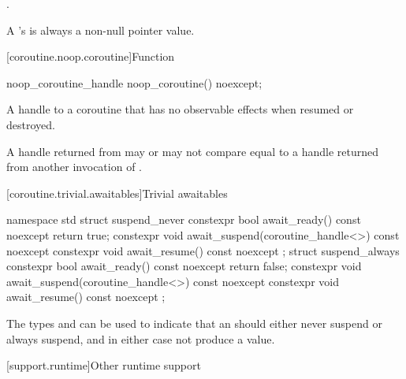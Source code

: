 \begin{itemdescr}
\pnum
\returns
{}.

\pnum
\remarks
A 's  is always a
non-null pointer value.
\end{itemdescr}

[coroutine.noop.coroutine]{Function }

%
\begin{itemdecl}
noop_coroutine_handle noop_coroutine() noexcept;
\end{itemdecl}

\begin{itemdescr}
\pnum
\returns
A handle to a coroutine that has no observable effects
when resumed or destroyed.

\pnum
\remarks
A handle returned from  may or may not
compare equal to a handle returned from another invocation
of .
\end{itemdescr}

[coroutine.trivial.awaitables]{Trivial awaitables}

%
%
%
%
%
%
%
%
\begin{codeblock}
namespace std {
  struct suspend_never {
    constexpr bool await_ready() const noexcept { return true; }
    constexpr void await_suspend(coroutine_handle<>) const noexcept {}
    constexpr void await_resume() const noexcept {}
  };
  struct suspend_always {
    constexpr bool await_ready() const noexcept { return false; }
    constexpr void await_suspend(coroutine_handle<>) const noexcept {}
    constexpr void await_resume() const noexcept {}
  };
}
\end{codeblock}

\pnum
\begin{note}
The types  and  can be used
to indicate that an  should either never
suspend or always suspend, and in either case not produce a value.
\end{note}

[support.runtime]{Other runtime support}

